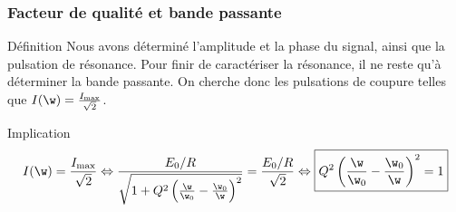 \documentclass[../main/main.tex]{subfiles}
\begin{document}
\subsubsection{Facteur de qualité et bande passante}
\begin{rdefi}{Définition}
    Nous avons déterminé l'amplitude et la phase du signal, ainsi que la
    pulsation de résonance. Pour finir de caractériser la résonance, il ne reste
    qu'à déterminer la bande passante. On cherche donc les pulsations de coupure
    telles que $I(\w) = \frac{I_{\max}}{\sqrt{2}}$.
\end{rdefi}
\begin{rimpl}{Implication}
    \vspace{-10pt}
    \begin{gather*}
        I(\w) = \frac{I_{\max}}{\sqrt{2}}
        \Leftrightarrow
        \frac{E_0/R}{\sqrt{1 + Q^2\left( \frac{\w}{\w_0} - \frac{\w_0}{\w}
                \right)^2}}
            =
            \frac{E_0/R}{\sqrt{2}}
            \Leftrightarrow
            \boxed{Q^2\left( \frac{\w}{\w_0} - \frac{\w_0}{\w} \right)^2 = 1}
    \end{gather*}
\end{rimpl}
\end{document}
